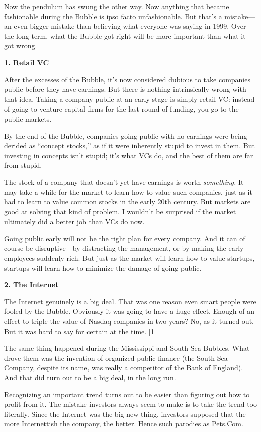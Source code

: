 Now the pendulum has swung the other way. Now anything that became
fashionable during the Bubble is ipso facto unfashionable. But that's a
mistake---an even bigger mistake than believing what everyone was saying
in 1999. Over the long term, what the Bubble got right will be more
important than what it got wrong.

\textbf{1. Retail VC}

After the excesses of the Bubble, it's now considered dubious to take
companies public before they have earnings. But there is nothing
intrinsically wrong with that idea. Taking a company public at an early
stage is simply retail VC: instead of going to venture capital firms for
the last round of funding, you go to the public markets.

By the end of the Bubble, companies going public with no earnings were
being derided as ``concept stocks,'' as if it were inherently stupid to
invest in them. But investing in concepts isn't stupid; it's what VCs
do, and the best of them are far from stupid.

The stock of a company that doesn't yet have earnings is worth
\emph{something.} It may take a while for the market to learn how to
value such companies, just as it had to learn to value common stocks in
the early 20th century. But markets are good at solving that kind of
problem. I wouldn't be surprised if the market ultimately did a better
job than VCs do now.

Going public early will not be the right plan for every company. And it
can of course be disruptive---by distracting the management, or by
making the early employees suddenly rich. But just as the market will
learn how to value startups, startups will learn how to minimize the
damage of going public.

\textbf{2. The Internet}

The Internet genuinely is a big deal. That was one reason even smart
people were fooled by the Bubble. Obviously it was going to have a huge
effect. Enough of an effect to triple the value of Nasdaq companies in
two years? No, as it turned out. But it was hard to say for certain at
the time. {[}1{]}

The same thing happened during the Mississippi and South Sea Bubbles.
What drove them was the invention of organized public finance (the South
Sea Company, despite its name, was really a competitor of the Bank of
England). And that did turn out to be a big deal, in the long run.

Recognizing an important trend turns out to be easier than figuring out
how to profit from it. The mistake investors always seem to make is to
take the trend too literally. Since the Internet was the big new thing,
investors supposed that the more Internettish the company, the better.
Hence such parodies as Pets.Com.

